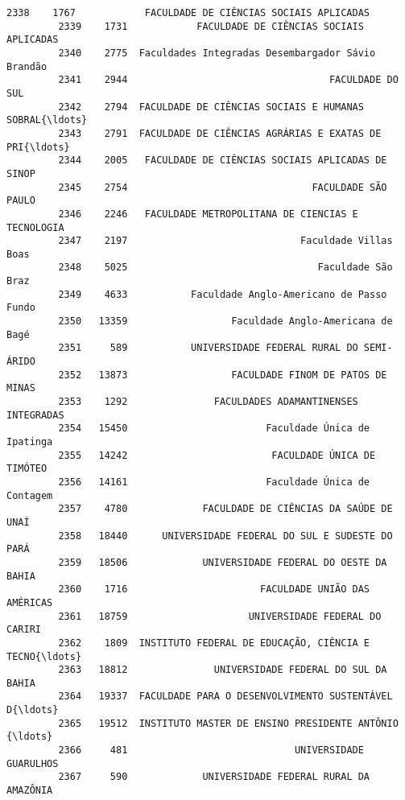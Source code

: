 \documentclass[11pt]{article}
\begin{document}
\begin{Verbatim}[commandchars=\\\{\}]
         2338    1767            FACULDADE DE CIÊNCIAS SOCIAIS APLICADAS   
         2339    1731            FACULDADE DE CIÊNCIAS SOCIAIS APLICADAS   
         2340    2775  Faculdades Integradas Desembargador Sávio Brandão   
         2341    2944                                   FACULDADE DO SUL   
         2342    2794  FACULDADE DE CIÊNCIAS SOCIAIS E HUMANAS SOBRAL{\ldots}   
         2343    2791  FACULDADE DE CIÊNCIAS AGRÁRIAS E EXATAS DE PRI{\ldots}   
         2344    2005   FACULDADE DE CIÊNCIAS SOCIAIS APLICADAS DE SINOP   
         2345    2754                                FACULDADE SÃO PAULO   
         2346    2246   FACULDADE METROPOLITANA DE CIENCIAS E TECNOLOGIA   
         2347    2197                              Faculdade Villas Boas   
         2348    5025                                 Faculdade São Braz   
         2349    4633           Faculdade Anglo-Americano de Passo Fundo   
         2350   13359                  Faculdade Anglo-Americana de Bagé   
         2351     589           UNIVERSIDADE FEDERAL RURAL DO SEMI-ÁRIDO   
         2352   13873                  FACULDADE FINOM DE PATOS DE MINAS   
         2353    1292               FACULDADES ADAMANTINENSES INTEGRADAS   
         2354   15450                        Faculdade Única de Ipatinga   
         2355   14242                         FACULDADE ÚNICA DE TIMÓTEO   
         2356   14161                        Faculdade Única de Contagem   
         2357    4780             FACULDADE DE CIÊNCIAS DA SAÚDE DE UNAÍ   
         2358   18440      UNIVERSIDADE FEDERAL DO SUL E SUDESTE DO PARÁ   
         2359   18506             UNIVERSIDADE FEDERAL DO OESTE DA BAHIA   
         2360    1716                       FACULDADE UNIÃO DAS AMÉRICAS   
         2361   18759                     UNIVERSIDADE FEDERAL DO CARIRI   
         2362    1809  INSTITUTO FEDERAL DE EDUCAÇÃO, CIÊNCIA E TECNO{\ldots}   
         2363   18812               UNIVERSIDADE FEDERAL DO SUL DA BAHIA   
         2364   19337  FACULDADE PARA O DESENVOLVIMENTO SUSTENTÁVEL D{\ldots}   
         2365   19512  INSTITUTO MASTER DE ENSINO PRESIDENTE ANTÔNIO {\ldots}   
         2366     481                             UNIVERSIDADE GUARULHOS   
         2367     590             UNIVERSIDADE FEDERAL RURAL DA AMAZÔNIA   
         

\end{Verbatim}
\end{document}
